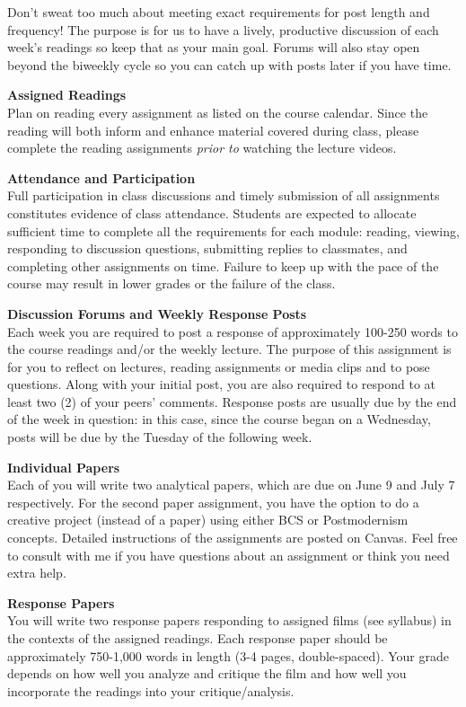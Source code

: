 \documentclass[
  letterpaper,
  DIV=11,
  numbers=noendperiod]{scrartcl}
\begin{document}
Don't sweat too much about meeting exact requirements for post length
and frequency! The purpose is for us to have a lively, productive
discussion of each week's readings so keep that as your main goal.
Forums will also stay open beyond the biweekly cycle so you can catch up
with posts later if you have time.

\textbf{Assigned Readings}\\
Plan on reading every assignment as listed on the course calendar. Since
the reading will both inform and enhance material covered during class,
please complete the reading assignments \emph{prior to} watching the
lecture videos.

\textbf{Attendance and Participation}\\
Full participation in class discussions and timely submission of all
assignments constitutes evidence of class attendance. Students are
expected to allocate sufficient time to complete all the requirements
for each module: reading, viewing, responding to discussion questions,
submitting replies to classmates, and completing other assignments on
time. Failure to keep up with the pace of the course may result in lower
grades or the failure of the class.

\textbf{Discussion Forums and Weekly Response Posts}\\
Each week you are required to post a response of approximately 100-250
words to the course readings and/or the weekly lecture. The purpose of
this assignment is for you to reflect on lectures, reading assignments
or media clips and to pose questions. Along with your initial post, you
are also required to respond to at least two (2) of your peers'
comments. Response posts are usually due by the end of the week in
question: in this case, since the course began on a Wednesday, posts
will be due by the Tuesday of the following week.

\textbf{Individual Papers}\\
Each of you will write two analytical papers, which are due on June 9
and July 7 respectively. For the second paper assignment, you have the
option to do a creative project (instead of a paper) using either BCS or
Postmodernism concepts. Detailed instructions of the assignments are
posted on Canvas. Feel free to consult with me if you have questions
about an assignment or think you need extra help.

\textbf{Response Papers}\\
You will write two response papers responding to assigned films (see
syllabus) in the contexts of the assigned readings. Each response paper
should be approximately 750-1,000 words in length (3-4 pages,
double-spaced). Your grade depends on how well you analyze and critique
the film and how well you incorporate the readings into your
critique/analysis.
\end{document}
